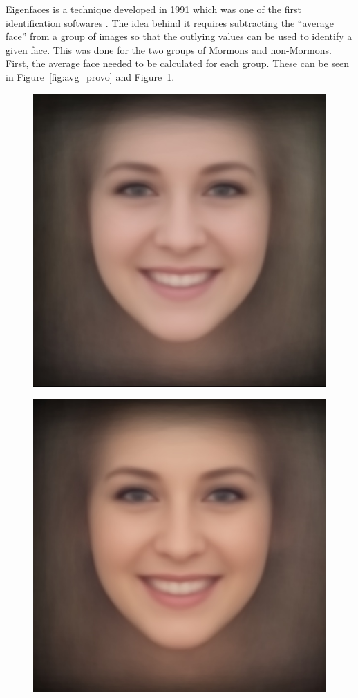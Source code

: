\documentclass{article}
\begin{document}
Eigenfaces is a technique developed in 1991 which was one of the first identification softwares \cite{Eigenfaces}. The idea behind it requires subtracting the ``average face'' from a group of images so that the outlying values can be used to identify a given face. This was done for the two groups of Mormons and non-Mormons. First, the average face needed to be calculated for each group. These can be seen in Figure~\ref{fig:avg_provo} and Figure~\ref{fig:avg_non}.

\begin{figure}
\centering
\begin{minipage}{.5\textwidth}
  \centering
  \includegraphics[width=.75\linewidth]{data/Provo_avg.jpg}
  \label{fig:avg_provo}
\end{minipage}%
\begin{minipage}{.5\textwidth}
  \centering
  \includegraphics[width=.75\linewidth]{data/Seattle_avg.jpg}
  \label{fig:avg_non}
\end{minipage}
\end{figure}
\end{document}
